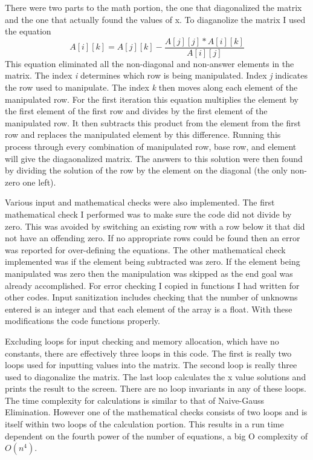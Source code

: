 \documentclass{article}
\begin{document}
There were two parts to the math portion, the one that diagonalized the matrix and the one that actually found the values of x. To diaganolize the matrix I used the equation
\begin{equation}
    A[i][k] = A[j][k] - \frac{A[j][j]*A[i][k]}{A[i][j]}
\end{equation}
This equation eliminated all the non-diagonal and non-answer elements in the matrix. The index \textit{i} determines which row is being manipulated. Index \textit{j} indicates the row used to manipulate. The index \textit{k} then moves along each element of the manipulated row. For the first iteration this equation multiplies the element by the first element of the first row and divides by the first element of the manipulated row. It then subtracts this product from the element from the first row and replaces the manipulated element by this difference. Running this process through every combination of manipulated row, base row, and element will give the diagaonalized matrix. The answers to this solution were then found by dividing the solution of the row by the element on the diagonal (the only non-zero one left).

Various input and mathematical checks were also implemented. The first mathematical check I performed was to make sure the code did not divide by zero. This was avoided by switching an existing row with a row below it that did not have an offending zero. If no appropriate rows could be found then an error was reported for over-defining the equations. The other mathematical check implemented was if the element being subtracted was zero. If the element being manipulated was zero then the manipulation was skipped as the end goal was already accomplished. For error checking I copied in functions I had written for other codes. Input sanitization includes checking that the number of unknowns entered is an integer and that each element of the array is a float. With these modifications the code functions properly.

Excluding loops for input checking and memory allocation, which have no constants, there are effectively three loops in this code. The first is really two loops used for inputting values into the matrix. The second loop is really three used to diagonalize the matrix. The last loop calculates the x value solutions and prints the result to the screen. There are no loop invariants in any of these loops. The time complexity for calculations is similar to that of Naive-Gauss Elimination. However one of the mathematical checks consists of two loops and is itself within two loops of the calculation portion. This results in a run time dependent on the fourth power of the number of equations, a big O complexity of $O(n^4)$.
\end{document}
